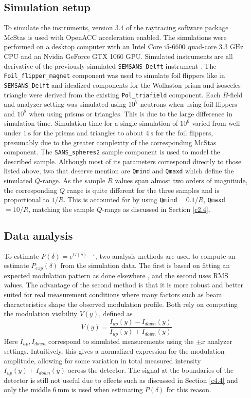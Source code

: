 \subsection{Simulation setup}
To simulate the instruments, version 3.4 of the raytracing software package McStas \cite{willendrup2020} is used with OpenACC acceleration enabled. The simulations were performed on a desktop computer with an Intel Core i5-6600 quad-core 3.3 GHz CPU and an Nvidia GeForce GTX 1060 GPU. Simulated instruments are all derivative of the previously simulated \texttt{SEMSANS\_Delft} instrument \cite{bouwman2021b}. The \texttt{Foil\_flipper\_magnet} component was used to simulate foil flippers like in \texttt{SEMSANS\_Delft} and idealized components for the Wollaston prism and isosceles triangle were derived from the existing \texttt{Pol\_triafield} component. Each $B$-field and analyzer setting was simulated using $10^7$ neutrons when using foil flippers and $10^8$ when using prisms or triangles. This is due to the large difference in simulation time. Simulation time for a single simulation of $10^6$ varied from well under $\SI{1}{\second}$ for the prisms and triangles to about $\SI{4}{\second}$ for the foil flippers, presumably due to the greater complexity of the corresponding McStas component. 
The \texttt{SANS\_spheres2} sample component is used to model the described sample. Although most of its parameters correspond directly to those listed above, two that deserve mention are \texttt{Qmind} and \texttt{Qmaxd} which define the simulated $Q$-range. As the sample $R$ values span almost two orders of magnitude, the corresponding $Q$ range is quite different for the three samples and is proportional to $1/R$. This is accounted for by using \texttt{Qmind}$=0.1/R$, \texttt{Qmaxd}$=10/R$, matching the sample $Q$-range as discussed in Section \ref{c2.4}.

\subsection{Data analysis}
To estimate $P(\delta) = e^{G(\delta)  - \tau}$, two analysis methods are used to compute an estimate $P_{exp}(\delta)$ from the simulation data. The first is based on fitting an expected modulation pattern as done elsewhere \cite{bouwman2011}\cite{parnell2023}, and the second uses RMS values. The advantage of the second method is that it is more robust and better suited for real measurement conditions where many factors such as beam characteristics shape the observed modulation profile. Both rely on computing the modulation visibility $V(y)$, defined as 
$$V(y) = \frac{I_{up}(y) - I_{down}(y)}{I_{up}(y) + I_{down}(y)}$$
Here $I_{up}, I_{down}$ correspond to simulated measurements using the $\pm x$ analyzer settings. Intuitively, this gives a normalized expression for the modulation amplitude, allowing for some variation in total measured intensity $I_{up}(y) + I_{down}(y)$ across the detector. The signal at the boundaries of the detector is still not useful due to effects such as discussed in Section \ref{c4.4} and only the middle $\SI{6}{\milli\meter}$ is used when estimating $P(\delta)$ for this reason.


